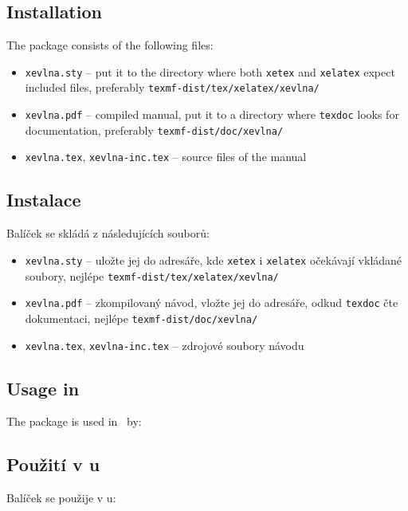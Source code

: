 \subsection{Installation}
The package consists of the following files:
\begin{itemize}
\item \texttt{xevlna.sty} – put it to the directory where both \texttt{xetex} and \texttt{xelatex}
expect included files, preferably \verb;texmf-dist/tex/xelatex/xevlna/;
\item \texttt{xevlna.pdf} – compiled manual, put it to a directory where \texttt{texdoc} looks for
documentation, preferably \verb;texmf-dist/doc/xevlna/;
\item \texttt{xevlna.tex}, \texttt{xevlna-inc.tex} – source files of the manual
\end{itemize}

\else

\subsection{Instalace}
Balíček se skládá z následujících souborů:
\begin{itemize}
\item \texttt{xevlna.sty} – uložte jej do adresáře, kde \texttt{xetex} i \texttt{xelatex}
očekávají vkládané soubory, nejlépe \verb;texmf-dist/tex/xelatex/xevlna/;
\item \texttt{xevlna.pdf} – zkompilovaný návod, vložte jej do adresáře, odkud \texttt{texdoc} čte
dokumentaci, nejlépe \verb;texmf-dist/doc/xevlna/;
\item \texttt{xevlna.tex}, \texttt{xevlna-inc.tex} – zdrojové soubory návodu
\end{itemize}

\fi


\ifeng

\subsection{Usage in \texorpdfstring{\XeLaTeX}{XeLaTeX}}
The package is used in \XeLaTeX\ by:

\else

\subsection{Použití v \texorpdfstring{\XeLaTeX u}{XeLaTeXu}}
Balíček se použije v \XeLaTeX u:


